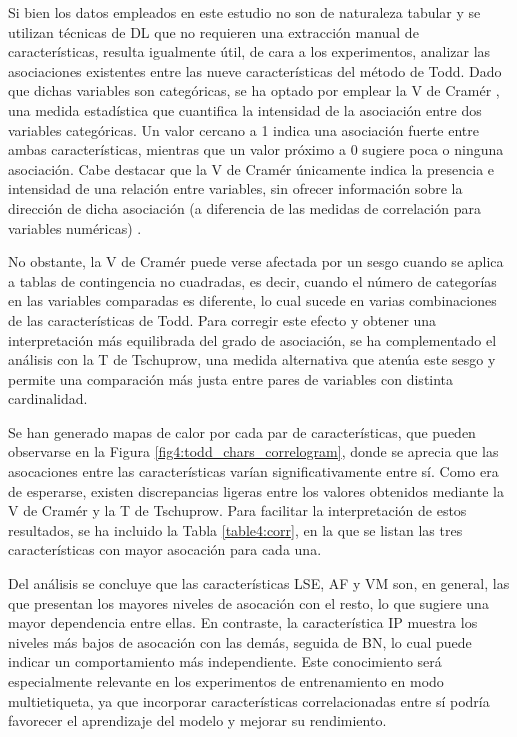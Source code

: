 Si bien los datos empleados en este estudio no son de naturaleza tabular y se utilizan técnicas de DL que no requieren una extracción manual de características, resulta igualmente útil, de cara a los experimentos, analizar las asociaciones existentes entre las nueve características del método de Todd. Dado que dichas variables son categóricas, se ha optado por emplear la V de Cramér \cite{sheskin_handbook_2020}, una medida estadística que cuantifica la intensidad de la asociación entre dos variables categóricas. Un valor cercano a 1 indica una asociación fuerte entre ambas características, mientras que un valor próximo a 0 sugiere poca o ninguna asociación. Cabe destacar que la V de Cramér únicamente indica la presencia e intensidad de una relación entre variables, sin ofrecer información sobre la dirección de dicha asociación (a diferencia de las medidas de correlación para variables numéricas) \cite{jimenez_nota_2024}.

No obstante, la V de Cramér puede verse afectada por un sesgo cuando se aplica a tablas de contingencia no cuadradas, es decir, cuando el número de categorías en las variables comparadas es diferente, lo cual sucede en varias combinaciones de las características de Todd. Para corregir este efecto y obtener una interpretación más equilibrada del grado de asociación, se ha complementado el análisis con la T de Tschuprow, una medida alternativa que atenúa este sesgo y permite una comparación más justa entre pares de variables con distinta cardinalidad.

Se han generado mapas de calor por cada par de características, que pueden observarse en la Figura \ref{fig4:todd_chars_correlogram}, donde se aprecia que las asocaciones entre las características varían significativamente entre sí. Como era de esperarse, existen discrepancias ligeras entre los valores obtenidos mediante la V de Cramér y la T de Tschuprow. Para facilitar la interpretación de estos resultados, se ha incluido la Tabla \ref{table4:corr}, en la que se listan las tres características con mayor asocación para cada una.

Del análisis se concluye que las características LSE, AF y VM son, en general, las que presentan los mayores niveles de asocación con el resto, lo que sugiere una mayor dependencia entre ellas. En contraste, la característica IP muestra los niveles más bajos de asocación con las demás, seguida de BN, lo cual puede indicar un comportamiento más independiente. Este conocimiento será especialmente relevante en los experimentos de entrenamiento en modo multietiqueta, ya que incorporar características correlacionadas entre sí podría favorecer el aprendizaje del modelo y mejorar su rendimiento.

